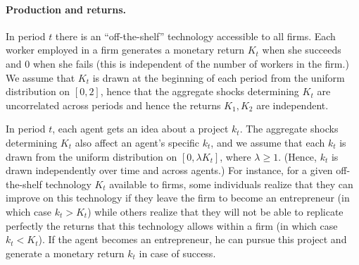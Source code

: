 \documentclass[12pt,american]{paper}
\theoremstyle{remark}
\begin{document}
\paragraph{Production and returns.}
In period $t$ there is an ``off-the-shelf'' technology accessible to all firms. Each worker employed in a firm generates a monetary return $K_t$ when she succeeds and $0$ when she fails (this is independent of the number of workers in the firm.) We assume that $K_t$ is drawn at the beginning of each period from the uniform distribution on $[0,2]$, hence that the aggregate shocks determining $K_t$ are uncorrelated across periods and hence the returns $K_1,K_2$ are independent.

In period $t$, each agent gets an idea about a project $k_t$. The aggregate shocks determining $K_t$ also affect an agent's specific $k_t$, and we assume that each $k_t$ is drawn from the uniform distribution on $[0,\lambda K_t]$, where $\lambda\geq 1$. (Hence, $k_t$ is drawn independently over time and across agents.)  For instance, for a given off-the-shelf technology $K_t$ available to firms, some individuals realize that they can improve on this technology if they leave the firm to become an entrepreneur (in which case $k_t>K_t$) while others realize that they will not be able to replicate perfectly the returns that this technology allows within a firm (in which case $k_t<K_t$). If the agent becomes an entrepreneur, he can pursue this project and generate a monetary return $k_t$ in case of success. 
\end{document}
